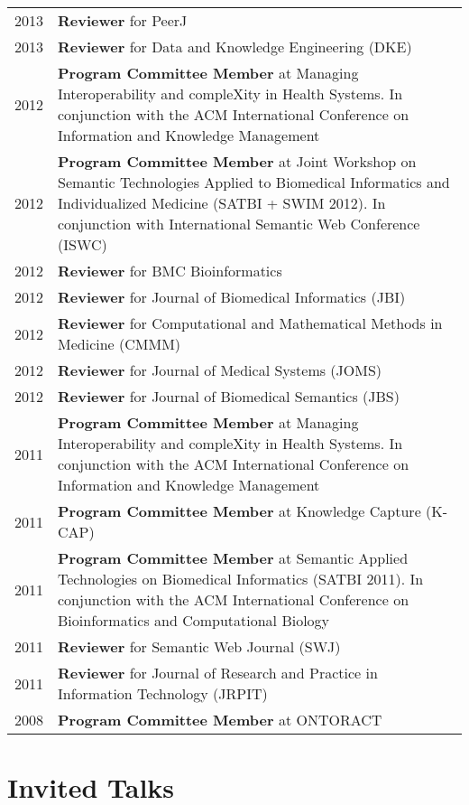 \documentclass[11pt,fullpage]{article}
\begin{document}
\begin{longtable}{p{0.5in}|p{5.5in}}
2013 & \textbf{Reviewer} for PeerJ \\
2013 & \textbf{Reviewer} for Data and Knowledge Engineering (DKE) \\
2012 & \textbf{Program Committee Member} at Managing Interoperability and compleXity in Health Systems. In conjunction with the ACM International Conference on Information and Knowledge Management\\
2012 & \textbf{Program Committee Member} at Joint Workshop on Semantic Technologies Applied to Biomedical Informatics and Individualized Medicine (SATBI + SWIM 2012). In conjunction with International Semantic Web Conference (ISWC)\\
2012 & \textbf{Reviewer} for BMC Bioinformatics \\
2012 & \textbf{Reviewer} for Journal of Biomedical Informatics (JBI) \\
2012 & \textbf{Reviewer} for Computational and Mathematical Methods in Medicine (CMMM) \\
2012 & \textbf{Reviewer} for Journal of Medical Systems (JOMS) \\
2012 & \textbf{Reviewer} for Journal of Biomedical Semantics (JBS) \\
2011 & \textbf{Program Committee Member} at Managing Interoperability and compleXity in Health Systems. In conjunction with the ACM International Conference on Information and Knowledge Management\\
2011 & \textbf{Program Committee Member} at Knowledge Capture (K-CAP)\\
2011 & \textbf{Program Committee Member} at Semantic Applied Technologies on Biomedical Informatics (SATBI 2011). In conjunction with the ACM International Conference on Bioinformatics and Computational Biology\\
2011 & \textbf{Reviewer} for Semantic Web Journal (SWJ) \\
2011 & \textbf{Reviewer} for Journal of Research and Practice in Information Technology (JRPIT)\\
2008 & \textbf{Program Committee Member} at ONTORACT \\

\end{longtable}


\section*{Invited Talks}
\end{document}
